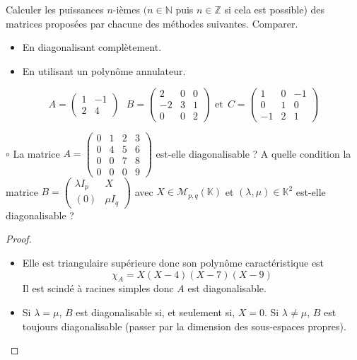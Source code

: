 \documentclass[french,a4paper]{article}
\newcommand{\N}{\mathbb{N}}
\newcommand{\Z}{\mathbb{Z}}
\newcommand{\K}{\mathbb{K}}
\theoremstyle{plain}
\theoremstyle{definition}
\theoremstyle{remark}
\begin{document}
\begin{ex}{}
	Calculer les puissances $n$-ièmes $(n\in\N$ puis $n\in\Z$ si cela est possible) des matrices proposées par chacune des méthodes suivantes. Comparer.
	\begin{itemize}
		\item En diagonalisant complètement.
		\item En utilisant un polynôme annulateur.
	\end{itemize}
	$$A=\begin{pmatrix}
		1&-1\\
		2&4
	\end{pmatrix}\ \ \ B=\begin{pmatrix}
	2&0&0\\
	-2&3&1\\
	0&0&2
	\end{pmatrix}\ \ \text{et}\ \ C=\begin{pmatrix}
	1&0&-1\\
	0&1&0\\
	-1&2&1
	\end{pmatrix}$$
\end{ex}

\begin{ex}{$\circ$}
	La matrice $A=\displaystyle\begin{pmatrix}
		0&1&2&3\\
		0&4&5&6\\
		0&0&7&8\\
		0&0&0&9
	\end{pmatrix}$ est-elle diagonalisable ? A quelle condition la matrice $B=\displaystyle\begin{pmatrix}
		\lambda I_p&X\\
		(0)&\mu I_q
	\end{pmatrix}$ avec $X\in\mathcal{M}_{p,q}(\K)$ et $(\lambda,\mu)\in\K^2$ est-elle diagonalisable ?
\end{ex}
\begin{proof}
	\begin{itemize}
		\item Elle est triangulaire supérieure donc son polynôme caractéristique est $$\chi_A=X(X-4)(X-7)(X-9)$$ Il est scindé à racines simples donc $A$ est diagonalisable.
		\item Si $\lambda=\mu$, $B$ est diagonalisable si, et seulement si, $X=0$. Si $\lambda\ne \mu$, $B$ est toujours diagonalisable (passer par la dimension des sous-espaces propres).
	\end{itemize}
\end{proof}
\end{document}
